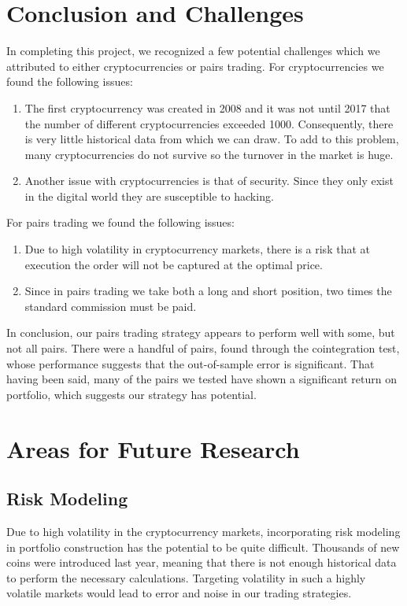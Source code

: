 \documentclass[12pt, letterpaper]{article}
\begin{document}
\section{Conclusion and Challenges}

In completing this project, we recognized a few potential challenges which we attributed to either cryptocurrencies or pairs trading. For cryptocurrencies we found the following issues:
\begin{enumerate}
	\item The first cryptocurrency was created in 2008 and it was not until 2017 that the number of different cryptocurrencies exceeded 1000. Consequently, there is very little historical data from which we can draw. To add to this problem, many cryptocurrencies do not survive so the turnover in the market is huge.
	\item Another issue with cryptocurrencies is that of security. Since they only exist in the digital world they are susceptible to hacking. 
\end{enumerate}
For pairs trading we found the following issues:
\begin{enumerate}
	\item Due to high volatility in cryptocurrency markets, there is a risk that at execution the order will not be captured at the optimal price.
	\item Since in pairs trading we take both a long and short position, two times the standard commission must be paid.
\end{enumerate}
In conclusion, our pairs trading strategy appears to perform well with some, but not all pairs. There were a handful of pairs, found through the cointegration test, whose performance suggests that the out-of-sample error is significant. That having been said, many of the pairs we tested have shown a significant return on portfolio, which suggests our strategy has potential.

\section{Areas for Future Research}
	\subsection{Risk Modeling}
	
	Due to high volatility in the cryptocurrency markets, incorporating risk modeling in portfolio construction has the potential to be quite difficult. Thousands of new coins were introduced last year, meaning that there is not  enough historical data to perform the necessary calculations. Targeting volatility in such a highly volatile markets would lead to error and noise in our trading strategies.
	
\end{document}
